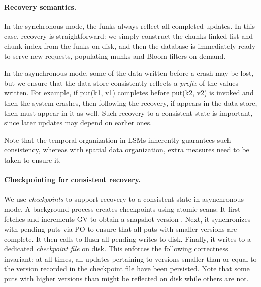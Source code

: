 \paragraph{Recovery semantics.}
In the synchronous mode, 
the funks always reflect all completed updates. In this case, recovery is straightforward: we simply construct
the chunks linked list and chunk index from the funks on disk, and then the database is immediately ready to serve new requests, populating munks and Bloom filters on-demand.  

In the asynchronous mode, some of the  data written before a crash may be lost, but we  
ensure that the data store consistently reflects a \emph{prefix} of the  values written.
For example, if put(k1, v1) completes before put(k2, v2) 
is invoked and then the system crashes, then following the recovery, 
if  appears in the data store, then  must appear in it as well. 
Such recovery to a consistent state is important, since later updates may depend on earlier ones. 

Note that the temporal organization in LSMs inherently guarantees such consistency, whereas with spatial data organization,
extra measures need to be taken to ensure it.

\paragraph{Checkpointing for consistent recovery.}

We use \emph{checkpoints} to support recovery to a consistent state in asynchronous mode.
A background process creates checkpoints using atomic scans: 
It first fetches-and-increments GV to obtain a snapshot version .  Next, 
it synchronizes with pending puts via PO to ensure that all puts with smaller versions are complete. 
It then calls  to flush all pending writes to disk.
Finally, it writes  to a dedicated \emph{checkpoint file} on disk.
This enforces the following correctness invariant: at all times, all updates pertaining to versions smaller 
than or equal to the version recorded in the checkpoint file have been persisted.
Note that some puts with higher versions than  might be reflected on disk while others are not. 

